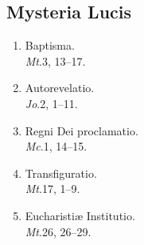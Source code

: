 \subsection*{Mysteria Lucis}
\vspace{-0.5em}

\begin{enumerate}[label={\roman*.}, itemsep=0pt]

\item
    Baptisma.
\\  {\it Mt}.\@ 3, 13--17.
\item
    Autorevelatio.
\\  {\it Jo}.\@ 2, 1--11.
\item
    Regni Dei proclamatio.
\\  {\it Mc}.\@ 1, 14--15.
\item
    Transfiguratio.
\\  {\it Mt}.\@ 17, 1--9.
\item
    Eucharistiæ Institutio.
\\  {\it Mt}.\@ 26, 26--29.
\end{enumerate}